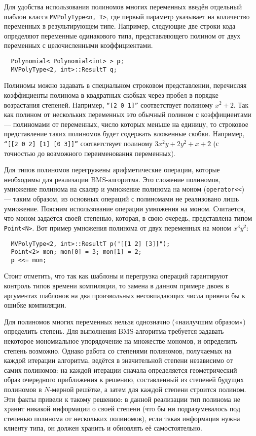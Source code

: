 \documentclass[14pt]{extarticle}
\newcommand{\nspace}{\hspace{0pt}}
\newcommand{\nbdash}{\nobreakdash-\nspace}
\begin{document}
Для удобства использования полиномов многих
переменных введён отдельный шаблон класса \lstinline$MVPolyType<n, T>$, где
первый параметр указывает на количество переменных в результирующем типе.
Например, следующие две строки кода определяют переменные одинакового типа,
представляющего полином от двух переменных с целочисленными коэффициентами.
\begin{lstlisting}
  Polynomial< Polynomial<int> > p;
  MVPolyType<2, int>::ResultT q;
\end{lstlisting}
Полиномы можно задавать в специальном строковом представлении, перечисляя
коэффициенты полинома в квадратных скобках через пробел в порядке возрастания
степеней. Например, \texttt{``[2 0 1]''} соответствует полиному $x^2 + 2$. Так
как полином от нескольких переменных это обычный полином с коэффициентами —
полиномами от переменных, число которых меньше на единицу, то строковое
представление таких полиномов будет содержать вложенные скобки. Например,
\texttt{``[[2 0 2] [1] [0 3]]''} соответствует полиному $3x^2y + 2y^2 + x + 2$ (с
точностью до возможного переименования переменных).

Для типов полиномов перегружены арифметические операции, которые необходимы для
реализации BMS-алгоритма. Это сложение полиномов, умножение полинома на скаляр и
умножение полинома на моном (\lstinline$operator<<$) — таким образом, из основных
операций с полиномами не реализовано лишь умножение. Поясним использование
операции умножения на моном. Считается, что моном задаётся своей степенью,
которая, в свою очередь, представлена типом \lstinline$Point<N>$. Вот пример
умножения полинома от двух переменных на моном $x^3y^2$:
\begin{lstlisting}
  MVPolyType<2, int>::ResultT p("[[1 2] [3]]");
  Point<2> mon; mon[0] = 3; mon[1] = 2;
  p <<= mon;
\end{lstlisting}
Стоит отметить, что так как шаблоны и перегрузка операций гарантируют контроль
типов времени компиляции, то замена в данном примере двоек в аргументах
шаблонов на два произвольных несовпадающих числа привела бы к ошибке компиляции.

Для полиномов многих переменных нельзя однозначно («наилучшим образом»)
определить степень. Для выполнения BMS-алгоритма требуется задавать некоторое
мономиальное упорядочение на множестве мономов, и определить
степень возможно. Однако работа со степенями полиномов, получаемых на каждой
итерации алгоритма, ведётся в значительной степени независимо от самих полиномов:
на каждой итерации сначала определяется геометрический образ очередного
приближения к решению, составленный из степеней будущих полиномов в
$N$\nbdash{}мерной решётке, а затем для каждой степени строится полином. Эти
факты привели к такому решению: в данной реализации тип полинома не хранит
никакой информации о своей степени (что бы ни подразумевалось под степенью полинома от
нескольких полиномов), если такая информация нужна клиенту типа, он должен
хранить и обновлять её самостоятельно.
\end{document}

